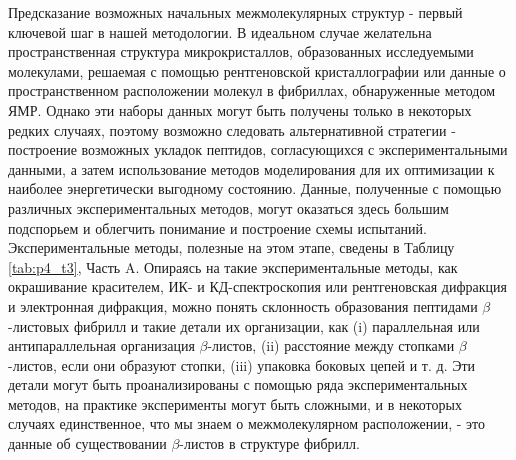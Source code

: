     Предсказание возможных начальных межмолекулярных структур - первый ключевой шаг в нашей методологии. В идеальном случае желательна пространственная структура микрокристаллов, образованных исследуемыми молекулами, решаемая с помощью рентгеновской кристаллографии или данные о пространственном расположении молекул в фибриллах, обнаруженные методом ЯМР. Однако эти наборы данных могут быть получены только в некоторых редких случаях, поэтому возможно следовать альтернативной стратегии - построение возможных укладок пептидов, согласующихся с экспериментальными данными, а затем использование методов моделирования для их оптимизации к наиболее энергетически выгодному состоянию. Данные, полученные с помощью различных экспериментальных методов, могут оказаться здесь большим подспорьем и облегчить понимание и построение схемы испытаний. Экспериментальные методы, полезные на этом этапе, сведены в Таблицу \ref{tab:p4_t3}, Часть A. Опираясь на такие экспериментальные методы, как окрашивание красителем, ИК- и КД-спектроскопия или рентгеновская дифракция и электронная дифракция, можно понять склонность образования пептидами $\beta$-листовых фибрилл и такие детали их организации, как (i) параллельная или антипараллельная организация $\beta$-листов, (ii) расстояние между стопками $\beta$-листов, если они образуют стопки, (iii) упаковка боковых цепей и т. д. Эти детали могут быть проанализированы с помощью ряда экспериментальных методов, на практике эксперименты могут быть сложными, и в некоторых случаях единственное, что мы знаем о межмолекулярном расположении, - это данные об существовании $\beta$-листов в структуре фибрилл.
    
